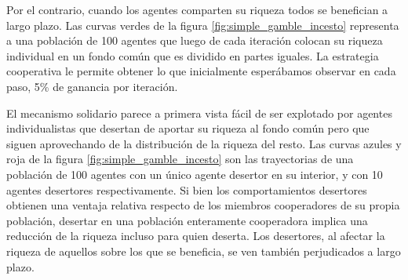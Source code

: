 \documentclass[a4paper,10pt]{book}
\begin{document}
Por el contrario, cuando los agentes comparten su riqueza todos se benefician a largo plazo.
Las curvas verdes de la figura \ref{fig:simple_gamble_incesto} representa a una población de 100 agentes que luego de cada iteración colocan su riqueza individual en un fondo común que es dividido en partes iguales.
La estrategia cooperativa le permite obtener lo que inicialmente esperábamos observar en cada paso, 5\% de ganancia por iteración.



El mecanismo solidario parece a primera vista fácil de ser explotado por agentes individualistas que desertan de aportar su riqueza al fondo común pero que siguen aprovechando de la distribución de la riqueza del resto.
Las curvas azules y roja de la figura \ref{fig:simple_gamble_incesto} son las trayectorias de una población de 100 agentes con un único agente desertor en su interior, y con 10 agentes desertores respectivamente.
Si bien los comportamientos desertores obtienen una ventaja relativa respecto de los miembros cooperadores de su propia población, desertar en una población enteramente cooperadora implica una reducción de la riqueza incluso para quien deserta.
Los desertores, al afectar la riqueza de aquellos sobre los que se beneficia, se ven también perjudicados a largo plazo.

\end{document}
